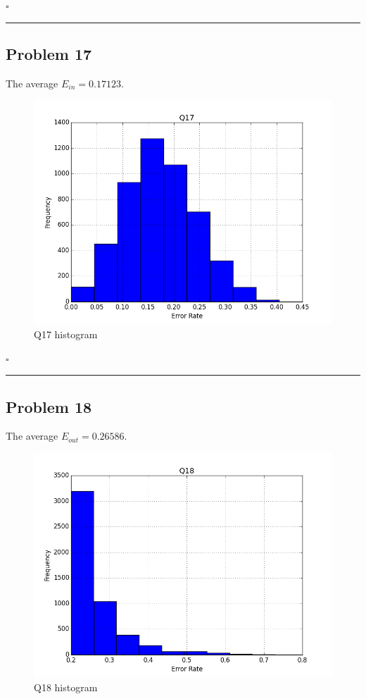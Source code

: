 \documentclass[12pt]{article}
\newcommand*{\QEDB}{\hfill\ensuremath{\square}}
\newcommand{\horrule}[1]{\rule{\linewidth}{#1}}
\begin{document}
\QEDB

\horrule{0.5pt}

\newpage
\subsection*{Problem 17}

The average $E_{in}=0.17123$.
\begin{figure}[h]
	\centering
	\includegraphics[scale=0.3]{Q17.png}
	\caption{Q17 histogram}
	\label{Q18}
\end{figure}

\QEDB

\horrule{0.5pt}

\subsection*{Problem 18}

The average $E_{out}=0.26586$.
\begin{figure}[h]
	\centering
	\includegraphics[scale=0.3]{Q18.png}
	\caption{Q18 histogram}
	\label{Q18}
\end{figure}
\end{document}
